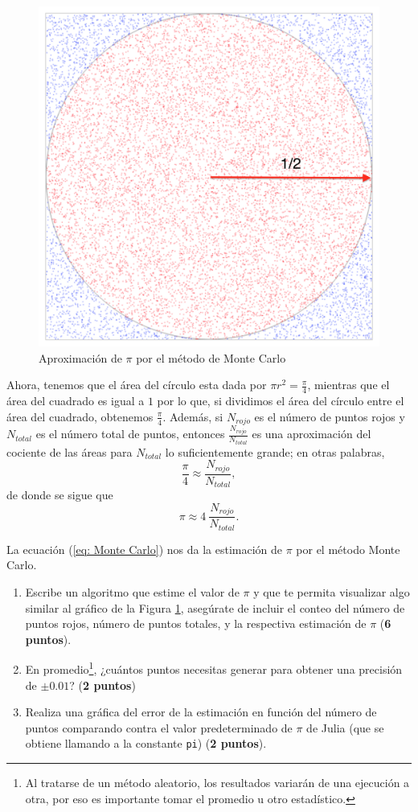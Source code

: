 \documentclass[a4paper,12pt]{article}
\begin{document}
\begin{figure}[h!]
    \centering
    \includegraphics[width=.4\linewidth]{img/pi.png}
    \caption{Aproximación de $\pi$ por el método de Monte Carlo}
    \label{fig:pi}
\end{figure}

Ahora, tenemos que el área del círculo esta dada por $\pi r^2 = \frac{\pi}{4}$, mientras que el área del cuadrado es igual a $1$ por lo que, si dividimos el área del círculo entre el área del cuadrado, obtenemos $\frac{\pi}{4}$. Además, si $N_{rojo}$ es el número de puntos rojos y $N_{total}$ es el número total de puntos, entonces $\frac{N_{rojo}}{N_{total}}$ es una aproximación del cociente de las áreas para $N_{total}$ lo suficientemente grande; en otras palabras,
\[
    \frac{\pi}{4} \approx \frac{N_{rojo}}{N_{total}},
\] 
de donde se sigue que
\begin{equation}\label{eq: Monte Carlo}
    \pi \approx 4\ \frac{N_{rojo}}{N_{total}}.
\end{equation}
    
\noindent La ecuación (\ref{eq: Monte Carlo}) nos da la estimación de $\pi$ por el método Monte Carlo.

\begin{enumerate}
    \item Escribe un algoritmo que estime el valor de $\pi$ y que te permita visualizar algo similar al gráfico de la Figura \ref{fig:pi}, asegúrate de incluir el conteo del número de puntos rojos, número de puntos totales, y la respectiva estimación de $\pi$ (\textbf{6 puntos}).
    \item En promedio\footnote{Al tratarse de un método aleatorio, los resultados variarán de una ejecución a otra, por eso es importante tomar el promedio u otro estadístico.}, ¿cuántos puntos necesitas generar para obtener una precisión de $\pm 0.01$? (\textbf{2 puntos})
    \item Realiza una gráfica del error de la estimación en función del número de puntos comparando contra el valor predeterminado de $\pi$ de Julia (que se obtiene llamando a la constante \texttt{pi}) (\textbf{2 puntos}).
\end{enumerate}
\newpage
\end{document}
